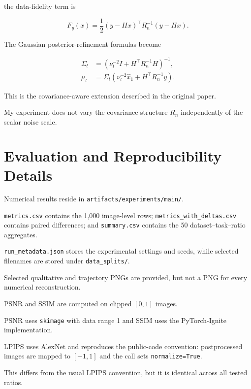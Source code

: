 \documentclass[11pt,a4paper]{article}
\begin{document}
the data-fidelity term is

\begin{equation}
    F_y(x)
    =
    \frac12
    (y-Hx)^\top
    R_n^{-1}
    (y-Hx).
\end{equation}

The Gaussian posterior-refinement formulas become

\begin{align}
    \Sigma_t
    &=
    (
        \nu_t^{-2}I
        +
        H^\top R_n^{-1}H
    )^{-1},
    \\
    \mu_t
    &=
    \Sigma_t
    (
        \nu_t^{-2}\widehat x_1
        +
        H^\top R_n^{-1}y
    ).
\end{align}

This is the covariance-aware extension described in the original paper.

My experiment does not vary the covariance structure $R_n$
independently of the scalar noise scale.



\section{Evaluation and Reproducibility Details}
\label{app:evaluation}

Numerical results reside in
\texttt{artifacts/experiments/main/}.

\texttt{metrics.csv} contains the 1,000 image-level rows;
\texttt{metrics\_with\_deltas.csv} contains paired differences;
and \texttt{summary.csv} contains the 50 dataset--task--ratio aggregates.

\texttt{run\_metadata.json} stores the experimental settings and seeds,
while selected filenames are stored under \texttt{data\_splits/}.

Selected qualitative and trajectory PNGs are provided,
but not a PNG for every numerical reconstruction.

PSNR and SSIM are computed on clipped $[0,1]$ images.

PSNR uses \texttt{skimage} with data range 1 and SSIM uses the
PyTorch-Ignite implementation.

LPIPS uses AlexNet and reproduces the public-code convention:
postprocessed images are mapped to $[-1,1]$ and the call sets
\texttt{normalize=True}.

This differs from the usual LPIPS convention,
but it is identical across all tested ratios.
\end{document}
